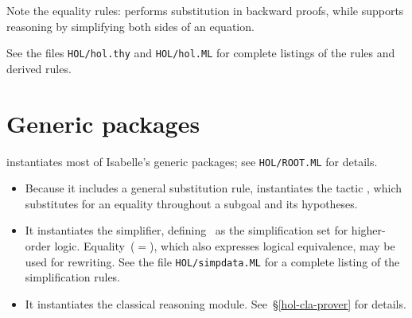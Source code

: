 Note the equality rules:  performs substitution in
backward proofs, while  supports reasoning by
simplifying both sides of an equation.

See the files {\tt HOL/hol.thy} and
{\tt HOL/hol.ML} for complete listings of the rules and
derived rules.


\section{Generic packages}
{\HOL} instantiates most of Isabelle's generic packages;
see {\tt HOL/ROOT.ML} for details.
\begin{itemize}
\item 
Because it includes a general substitution rule, {\HOL} instantiates the
tactic , which substitutes for an equality
throughout a subgoal and its hypotheses.
\item 
It instantiates the simplifier, defining~ as the
simplification set for higher-order logic.  Equality~($=$), which also
expresses logical equivalence, may be used for rewriting.  See the file
{\tt HOL/simpdata.ML} for a complete listing of the simplification
rules. 
\item 
It instantiates the classical reasoning module.  See~\S\ref{hol-cla-prover}
for details. 
\end{itemize}


